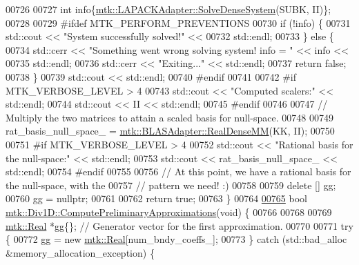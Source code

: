 \begin{DoxyCode}
{{00726 
00727   \textcolor{keywordtype}{int} info\{\hyperlink{classmtk_1_1LAPACKAdapter_a7428bccf74fd4a4af68fb7233846da22}{mtk::LAPACKAdapter::SolveDenseSystem}(SUBK, II)\};
00728 
00729 \textcolor{preprocessor}{  #ifdef MTK\_PERFORM\_PREVENTIONS}
00730   \textcolor{keywordflow}{if} (!info) \{
00731     std::cout << \textcolor{stringliteral}{"System successfully solved!"} <<
00732       std::endl;
00733   \} \textcolor{keywordflow}{else} \{
00734     std::cerr << \textcolor{stringliteral}{"Something went wrong solving system! info = "} << info <<
00735       std::endl;
00736     std::cerr << \textcolor{stringliteral}{"Exiting..."} << std::endl;
00737     \textcolor{keywordflow}{return} \textcolor{keyword}{false};
00738   \}
00739   std::cout << std::endl;
00740 \textcolor{preprocessor}{  #endif}
00741 
00742 \textcolor{preprocessor}{  #if MTK\_VERBOSE\_LEVEL > 4}
00743   std::cout << \textcolor{stringliteral}{"Computed scalers:"} << std::endl;
00744   std::cout << II << std::endl;
00745 \textcolor{preprocessor}{  #endif}
00746 
00747   \textcolor{comment}{// Multiply the two matrices to attain a scaled basis for null-space.}
00748 
00749   rat\_basis\_null\_space\_ = \hyperlink{classmtk_1_1BLASAdapter_acebd0e9bfe0bdd609c7fbea98ccfd3b5}{mtk::BLASAdapter::RealDenseMM}(KK, II);
00750 
00751 \textcolor{preprocessor}{  #if MTK\_VERBOSE\_LEVEL > 4}
00752   std::cout << \textcolor{stringliteral}{"Rational basis for the null-space:"} << std::endl;
00753   std::cout << rat\_basis\_null\_space\_ << std::endl;
00754 \textcolor{preprocessor}{  #endif}
00755 
00756   \textcolor{comment}{// At this point, we have a rational basis for the null-space, with the}
00757   \textcolor{comment}{// pattern we need! :)}
00758 
00759   \textcolor{keyword}{delete} [] gg;
00760   gg = \textcolor{keyword}{nullptr};
00761 
00762   \textcolor{keywordflow}{return} \textcolor{keyword}{true};
00763 \}
00764 
\hypertarget{mtk__div__1d_8cc_source_l00765}{}\hyperlink{classmtk_1_1Div1D_a4be0534a4e22d44a7aedde326cc3f3b6}{00765} \textcolor{keywordtype}{bool} \hyperlink{classmtk_1_1Div1D_a4be0534a4e22d44a7aedde326cc3f3b6}{mtk::Div1D::ComputePreliminaryApproximations}(\textcolor{keywordtype}{void}) \{
00766 
00768 
00769   \hyperlink{group__c01-roots_gac080bbbf5cbb5502c9f00405f894857d}{mtk::Real} *gg\{\}; \textcolor{comment}{// Generator vector for the first approximation.}
00770 
00771   \textcolor{keywordflow}{try} \{
00772     gg = \textcolor{keyword}{new} \hyperlink{group__c01-roots_gac080bbbf5cbb5502c9f00405f894857d}{mtk::Real}[num\_bndy\_coeffs\_];
00773   \} \textcolor{keywordflow}{catch} (std::bad\_alloc &memory\_allocation\_exception) \{
}}
\end{DoxyCode}
